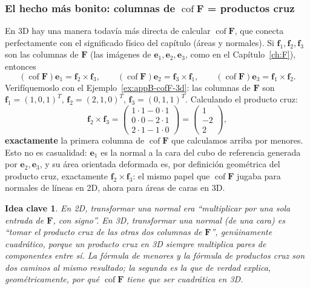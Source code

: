 \documentclass[11pt,a4paper]{article}
\newtheorem{takeaway}{Idea clave}
\newcommand{\Cof}{\operatorname{cof}}
\begin{document}
\subsubsection*{El hecho m\'as bonito: columnas de $\Cof\bm F$ = productos cruz}

En 3D hay una manera todav\'ia m\'as directa de calcular $\Cof\bm F$,
que conecta perfectamente con el significado f\'isico del
cap\'itulo (\'areas y normales). Si $\bm f_1,\bm f_2,\bm f_3$ son las
columnas de $\bm F$ (las im\'agenes de $\bm e_1,\bm e_2,\bm e_3$, como
en el Cap\'itulo~\ref{ch:F}), entonces
\begin{equation}
 (\Cof\bm F)\bm e_1=\bm f_2\times\bm f_3,\qquad
 (\Cof\bm F)\bm e_2=\bm f_3\times\bm f_1,\qquad
 (\Cof\bm F)\bm e_3=\bm f_1\times\bm f_2.
 \label{eq:appB-cofF-cross}
\end{equation}
Verif\'iquemoslo con el Ejemplo~\ref{ex:appB-cofF-3d}: las columnas de
$\bm F$ son $\bm f_1=(1,0,1)^T$, $\bm f_2=(2,1,0)^T$, $\bm f_3=(0,1,1)^T$.
Calculando el producto cruz:
\[
 \bm f_2\times\bm f_3=\begin{pmatrix}1\cdot1-0\cdot1\\0\cdot0-2\cdot1\\2\cdot1-1\cdot0\end{pmatrix}
 =\begin{pmatrix}1\\-2\\2\end{pmatrix},
\]
\textbf{exactamente} la primera columna de $\Cof\bm F$ que calculamos
arriba por menores. Esto no es casualidad: $\bm e_1$ es la normal a la
cara del cubo de referencia generada por $\bm e_2,\bm e_3$, y su
\'area orientada deformada es, por definici\'on geom\'etrica del
producto cruz, exactamente $\bm f_2\times\bm f_3$: el mismo papel
que $\Cof\bm F$ jugaba para normales de l\'ineas en 2D, ahora para
\'areas de caras en 3D.

\begin{takeaway}
En 2D, transformar una normal era ``multiplicar por una sola entrada
de $\bm F$, con signo''. En 3D, transformar una normal (de una cara)
es ``tomar el producto cruz de las otras dos columnas de $\bm F$'',
gen\'uinamente cuadr\'atico, porque un producto cruz en 3D
\emph{siempre} multiplica pares de componentes entre s\'i. La f\'ormula
de menores y la f\'ormula de productos cruz son dos caminos al mismo
resultado; la segunda es la que de verdad explica, geom\'etricamente,
por qu\'e $\Cof\bm F$ tiene que ser cuadr\'atica en 3D.
\end{takeaway}
\end{document}
